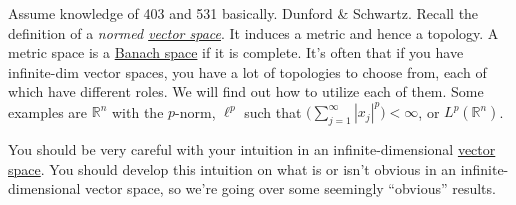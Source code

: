 Assume knowledge of 403 and 531 basically. Dunford \& Schwartz. Recall the definition of a \textit{normed \hyperref[lin-def:vector-space]{vector space}}. It induces a metric and hence a topology. A metric space is a \hyperref[mv-def:banach-space]{Banach space} if it is complete. It's often that if you have infinite-dim vector spaces, you have a lot of topologies to choose from, each of which have different roles. We will find out how to utilize each of them. Some examples are $\mathbb{R}^n$ with the $p$-norm, $\ell^p$ such that $\big( \sum_{j=1}^\infty |x_j|^p \big) < \infty$, or $L^p (\mathbb{R}^n)$. 

You should be very careful with your intuition in an infinite-dimensional \hyperref[lin-def:vector-space]{vector space}. You should develop this intuition on what is or isn't obvious in an infinite-dimensional vector space, so we're going over some seemingly ``obvious'' results. 

